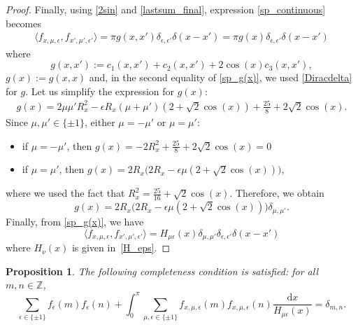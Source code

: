 \documentclass[11pt]{amsart}
\newcommand{\Z}{\mathbb{Z}}
\theoremstyle{definition}
\theoremstyle{remark}
\theoremstyle{plain}
\newtheorem{proposition}{Proposition}
\numberwithin{equation}{section}
\numberwithin{lemma}{section}
\numberwithin{definition}{section}
\numberwithin{proposition}{section}
\numberwithin{corollary}{section}
\numberwithin{theorem}{section}
\numberwithin{remark}{section}
\begin{document}
\begin{proof}
Finally, using \eqref{2sin} and \eqref{lastsum_final}, expression \eqref{sp_continuous} becomes
\begin{align}
 \langle f_{x,\mu,\epsilon},  f_{x',\mu',\epsilon'} \rangle =\pi g(x,x')\delta_{\epsilon,\epsilon'}\delta(x-x')=\pi g(x)\delta_{\epsilon,\epsilon'}\delta(x-x') \label{sp_g(x)}
\end{align} 
where 
$$
 g(x,x'):= c_1(x,x')+c_2(x,x')+2\cos(x)c_3(x,x'),
$$
$g(x):=g(x,x)$
and, in the second equality of \eqref{sp_g(x)}, we used \eqref{Diracdelta} for $g$.
Let us simplify the expression for $g(x)$:
\begin{align*}
 g(x) = 2\mu\mu'R_x^2-\epsilon R_x(\mu+\mu')(2+\sqrt{2}\cos(x))+\frac{25}{8}+2\sqrt{2}\cos(x).
\end{align*}
Since $\mu,\mu'\in\{\pm 1\}$, either $\mu=-\mu'$ or $\mu=\mu'$:
\begin{itemize}
 \item if $\mu=-\mu'$, then $g(x)=-2R_x^2+\frac{25}{8}+2\sqrt{2}\cos(x)=0$
 \item if $\mu=\mu'$, then $g(x)=2R_x\big(2R_x-\epsilon\mu(2+\sqrt{2}\cos(x))\big)$,
 \end{itemize}
 where we used the fact that $R_x^2=\frac{25}{16}+\sqrt{2}\cos(x)$.
Therefore, we obtain
$$
g(x)=2R_x\big(2R_x-\epsilon\mu(2+\sqrt{2}\cos(x))\big)\delta_{\mu,\mu'}.
$$ 
Finally, from \eqref{sp_g(x)}, we have 
$$
 \langle f_{x,\mu,\epsilon},  f_{x',\mu',\epsilon'} \rangle=H_{\mu\epsilon}(x)\delta_{\mu,\mu'}\delta_{\epsilon,\epsilon'}\delta(x-x')
$$
where $H_{\nu}(x)$ is given in~\eqref{H_eps}.
\end{proof}

\begin{proposition}\label{completeness1}  
The following completeness condition is satisfied: for all $m,n\in\Z$,
$$
\sum_{\epsilon\in\{\pm1\}}f_\epsilon(m)f_\epsilon(n)+\int_0^\pi \sum_{\mu,\epsilon\in\{\pm1\}}f_{x,\mu,\epsilon}(m)f_{x,\mu,\epsilon}(n)\frac{\mathrm{d}x}{H_{\mu\epsilon}(x)}=\delta_{m,n}.
$$
\end{proposition}
\end{document}

